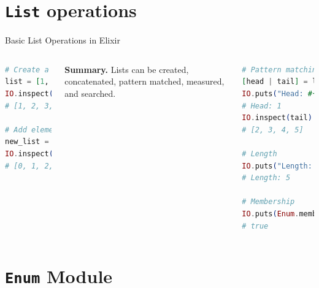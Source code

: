 \documentclass[aspectratio=169, table]{beamer}
\begin{document}
\section{\texttt{List} operations}

\begin{frame}[fragile]{Basic List Operations in Elixir}
\begin{columns}[t]
\begin{lstlisting}[language=Elixir, basicstyle=\ttfamily\small]
# Create a list
list = [1, 2, 3, 4, 5]
IO.inspect(list)
# [1, 2, 3, 4, 5]

# Add element at head
new_list = [0 | list]
IO.inspect(new_list)
# [0, 1, 2, 3, 4, 5]
\end{lstlisting}

\vspace{6pt}
\textbf{Summary.}  
Lists can be created, concatenated,  
pattern matched, measured, and searched.  

\begin{lstlisting}[language=Elixir, basicstyle=\ttfamily\small]
# Pattern matching
[head | tail] = list
IO.puts("Head: #{head}")
# Head: 1
IO.inspect(tail)
# [2, 3, 4, 5]

# Length
IO.puts("Length: #{length(list)}")
# Length: 5

# Membership
IO.puts(Enum.member?(list, 3))
# true
\end{lstlisting}
\end{columns}
\end{frame}

\section{\texttt{Enum} Module}
\end{document}
